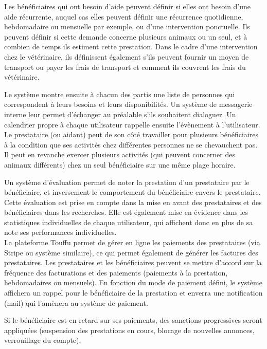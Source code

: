 \documentclass[conference]{IEEEtran}
\begin{document}
Les bénéficiaires qui ont besoin d'aide peuvent définir si elles ont besoin d'une aide récurrente, auquel cas elles peuvent définir une récurrence quotidienne, hebdomadaire ou mensuelle par exemple, ou d'une intervention ponctuelle. Ils peuvent définir si cette demande concerne plusieurs animaux ou un seul, et à combien de temps ils estiment cette prestation. Dans le cadre d'une intervention chez le vétérinaire, ils définissent également s'ils peuvent fournir un moyen de transport ou payer les frais de transport et comment ils couvrent les frais du vétérinaire.

Le système montre ensuite à chacun des partis une liste de personnes qui correspondent à leurs besoins et leurs disponibilités. Un système de messagerie interne leur permet d'échanger au préalable s'ils souhaitent dialoguer. Un calendrier propre à chaque utilisateur rappelle ensuite l'évènement à l'utilisateur.\\

Le prestataire (ou aidant) peut de son côté travailler pour plusieurs bénéficiaires à la condition que ses activités chez différentes personnes ne se chevauchent pas. Il peut en revanche exercer plusieurs activités (qui peuvent concerner des animaux différents) chez un seul bénéficiaire sur une même plage horaire.

Un système d'évaluation permet de noter la prestation d'un prestataire par le bénéficiaire, et inversement le comportement du bénéficiaire envers le prestataire. Cette évaluation est prise en compte dans la mise en avant des prestataires et des bénéficiaires dans les recherches. Elle est également mise en évidence dans les statistiques individuelles de chaque utilisateur, qui affichent donc en plus de sa note ses performances individuelles.\\

La plateforme Touffu permet de gérer en ligne les paiements des prestataires (via Stripe ou système similaire), ce qui permet également de générer les factures des prestataires. Les prestataires et les bénéficiaires peuvent se mettre d'accord sur la fréquence des facturations et des paiements (paiements à la prestation, hebdomadaires ou mensuels). En fonction du mode de paiement défini, le système affichera un rappel pour le bénéficiaire de la prestation et enverra une notification (mail) qui l'amènera au système de paiement.

Si le bénéficiaire est en retard sur ses paiements, des sanctions progressives seront appliquées (suspension des prestations en cours, blocage de nouvelles annonces, verrouillage du compte).
\\
\end{document}

